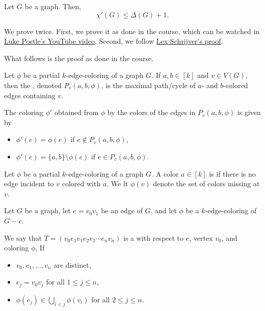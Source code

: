 \begin{theorem} \label{thm:vizing}
    Let \(G\) be a graph.
    Then,
    \begin{equation}
        \chi'(G) \leq \Delta(G) + 1.
    \end{equation}
\end{theorem}

We prove  twice.
First, we prove it as done in the course, which can be watched in \href{https://youtu.be/9t76UcdgiGI}{Luke Postle's YouTube video}.
Second, we follow \href{https://homepages.cwi.nl/~lex/files/vizing.pdf}{Lex Schrijver's proof}.

What follows is the proof as done in the course.

\begin{definition}
    Let \(\phi\) be a partial \(k\)-edge-coloring of a graph \(G\).
    If \(a, b \in [k]\) and \(v \in V(G)\),
    then the ,
    denoted \(P_v(a, b, \phi)\),
    is the maximal path/cycle of \(a\)- and \(b\)-colored edges containing \(v\).
\end{definition}

\begin{definition}[Switching]
    The coloring \(\phi'\) obtained from \(\phi\) by  the colors of the edges in \(P_v(a, b, \phi)\) is given by
    \begin{itemize}
        \item \(\phi'(e) = \phi(e)\) if \(e \notin P_v(a, b, \phi)\),
        \item \(\phi'(e) = \{a, b\} \setminus \phi(e)\) if \(e \in P_v(a, b, \phi)\).
    \end{itemize}
\end{definition}

\begin{definition}
    Let \(\phi\) be a partial \(k\)-edge-coloring of a graph \(G\).
    A color \(a \in [k]\) is  if there is no edge incident to \(v\) colored with \(a\).
    We lt \(\phi(v)\) denote the set of colors missing at \(v\).
\end{definition}

\begin{definition}
    Let \(G\) be a graph,
    let \(e = v_0v_1\) be an edge of \(G\),
    and let \(\phi\) be a \(k\)-edge-coloring of \(G - e\).

    We say that \(T = (v_0e_1v_1e_2v_2 \cdots e_nv_n)\) is a  with respect to \(e\), vertex \(v_0\), and coloring \(\phi\), If
    \begin{itemize}
        \item \(v_0, v_1, \ldots, v_n\) are distinct,
        \item \(e_j = v_0v_j\) for all \(1 \leq j \leq n\),
        \item \(\phi(e_j) \in \bigcup_{i < j} \phi(v_i)\) for all \(2 \leq j \leq n\).
    \end{itemize}
\end{definition}

